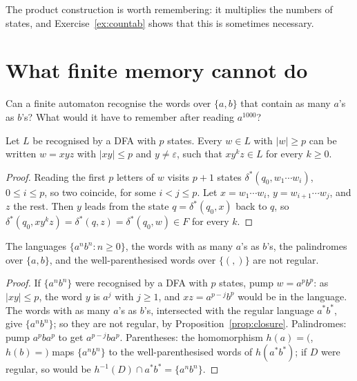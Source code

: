 The product construction is worth remembering: it multiplies the numbers of states, and Exercise~\ref{ex:countab} shows that this is sometimes necessary.

\section{What finite memory cannot do}\label{sec:pumping}

\begin{think}
Can a finite automaton recognise the words over $\{a,b\}$ that contain as many $a$'s as $b$'s? What would it have to remember after reading $a^{1000}$?
\end{think}

\begin{lemma}\label{lem:pumping}
Let $L$ be recognised by a DFA with $p$ states. Every $w\in L$ with $|w|\ge p$ can be written $w=xyz$ with $|xy|\le p$ and $y\ne\varepsilon$, such that $xy^kz\in L$ for every $k\ge0$.
\end{lemma}

\begin{proof}
Reading the first $p$ letters of $w$ visits $p+1$ states $\delta^*(q_0,w_1\cdots w_i)$, $0\le i\le p$, so two coincide, for some $i<j\le p$. Let $x=w_1\cdots w_i$, $y=w_{i+1}\cdots w_j$, and $z$ the rest. Then $y$ leads from the state $q=\delta^*(q_0,x)$ back to $q$, so $\delta^*(q_0,xy^kz)=\delta^*(q,z)=\delta^*(q_0,w)\in F$ for every $k$.
\end{proof}

\begin{proposition}\label{prop:nonregular}
The languages $\{a^nb^n:n\ge0\}$, the words with as many $a$'s as $b$'s, the palindromes over $\{a,b\}$, and the well-parenthesised words over $\{(,)\}$ are not regular.
\end{proposition}

\begin{proof}
If $\{a^nb^n\}$ were recognised by a DFA with $p$ states, pump $w=a^pb^p$: as $|xy|\le p$, the word $y$ is $a^j$ with $j\ge1$, and $xz=a^{p-j}b^p$ would be in the language. The words with as many $a$'s as $b$'s, intersected with the regular language $a^*b^*$, give $\{a^nb^n\}$; so they are not regular, by Proposition~\ref{prop:closure}. Palindromes: pump $a^pba^p$ to get $a^{p-j}ba^p$. Parentheses: the homomorphism $h(a)={(}$, $h(b)={)}$ maps $\{a^nb^n\}$ to the well-parenthesised words of $h(a^*b^*)$; if $D$ were regular, so would be $h^{-1}(D)\cap a^*b^*=\{a^nb^n\}$.
\end{proof}

